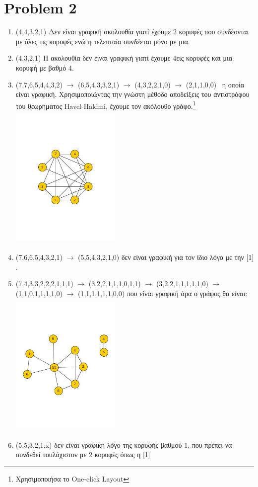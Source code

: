 \documentclass{article}
\begin{document}
\section*{Problem 2}
\begin{enumerate}
\item[1]
(4,4,3,2,1) Δεν είναι γραφική ακολουθία γιατί έχουμε 2 κορυφές που συνδέονται με όλες τις κορυφές ενώ η τελευταία συνδέεται μόνο με μια.
\item[2]
(4,3,2,1) Η ακολουθία δεν είναι γραφική γιατί έχουμε 4εις κορυφές και μια κορυφή με βαθμό 4.
\item[3]
(7,7,6,5,4,4,3,2) $\rightarrow $ (6,5,4,3,3,2,1) $\rightarrow $ (4,3,2,2,1,0) $\rightarrow$ (2,1,1,0,0) \ η οποία είναι γραφική. Χρησιμοποιώντας την γνώστη μέθοδο αποδείξεις του αντιστρόφου του θεωρήματος Havel-Hakimi, έχουμε τον ακόλουθο γράφο.\footnote{Χρησιμοποιήσα το One-click Layout}\\ \includegraphics[height=200pt,width=150pt]{ex2prob3} 
\item[4]
(7,6,6,5,4,3,2,1) $\rightarrow$ (5,5,4,3,2,1,0) δεν είναι γραφική για τον ίδιο λόγο με την [1] .
\item[5]
(7,4,3,3,2,2,2,1,1,1) $\rightarrow$ (3,2,2,1,1,1,0,1,1) $\rightarrow$ (3,2,2,1,1,1,1,1,0) $\rightarrow$ (1,1,0,1,1,1,1,0) $\rightarrow$ (1,1,1,1,1,1,0,0) που είναι γραφική άρα ο γράφος θα είναι: \\ \includegraphics[height=200pt,width=150pt]{ex2prob5} 
\item[6]
(5,5,3,2,1,x) δεν είναι γραφική λόγο της κορυφής βαθμού 1, που πρέπει να συνδεθεί τουλάχιστον με 2 κορυφές όπως η [1]
\end{enumerate}
\end{document}
